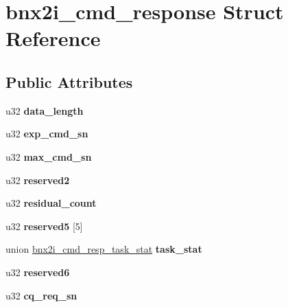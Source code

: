 \hypertarget{structbnx2i__cmd__response}{
\section{bnx2i\_\-cmd\_\-response Struct Reference}
\label{structbnx2i__cmd__response}
}
\subsection*{Public Attributes}
\begin{DoxyCompactItemize}
\item 
\hypertarget{structbnx2i__cmd__response_a04a27cf2d46ed4e6c29d33fe7ab5e81f}{
u32 {\bfseries data\_\-length}}
\label{structbnx2i__cmd__response_a04a27cf2d46ed4e6c29d33fe7ab5e81f}

\item 
\hypertarget{structbnx2i__cmd__response_aae738c34e5d8c9e93c7c438489730bad}{
u32 {\bfseries exp\_\-cmd\_\-sn}}
\label{structbnx2i__cmd__response_aae738c34e5d8c9e93c7c438489730bad}

\item 
\hypertarget{structbnx2i__cmd__response_a3ab0225e319b49ed438cc2d0af93ce5d}{
u32 {\bfseries max\_\-cmd\_\-sn}}
\label{structbnx2i__cmd__response_a3ab0225e319b49ed438cc2d0af93ce5d}

\item 
\hypertarget{structbnx2i__cmd__response_a785c4765be0e9d01d0af6f15069ec98c}{
u32 {\bfseries reserved2}}
\label{structbnx2i__cmd__response_a785c4765be0e9d01d0af6f15069ec98c}

\item 
\hypertarget{structbnx2i__cmd__response_a8b95b6c8cf158ab0be5cbae2731f65fe}{
u32 {\bfseries residual\_\-count}}
\label{structbnx2i__cmd__response_a8b95b6c8cf158ab0be5cbae2731f65fe}

\item 
\hypertarget{structbnx2i__cmd__response_aaa356564581e1449499ee4d14cce8000}{
u32 {\bfseries reserved5} \mbox{[}5\mbox{]}}
\label{structbnx2i__cmd__response_aaa356564581e1449499ee4d14cce8000}

\item 
\hypertarget{structbnx2i__cmd__response_a6eb7620dad21cdd37784af467d47f158}{
union \hyperlink{unionbnx2i__cmd__resp__task__stat}{bnx2i\_\-cmd\_\-resp\_\-task\_\-stat} {\bfseries task\_\-stat}}
\label{structbnx2i__cmd__response_a6eb7620dad21cdd37784af467d47f158}

\item 
\hypertarget{structbnx2i__cmd__response_a6e5cade368e8a9891c6d9aae3e268c25}{
u32 {\bfseries reserved6}}
\label{structbnx2i__cmd__response_a6e5cade368e8a9891c6d9aae3e268c25}

\item 
\hypertarget{structbnx2i__cmd__response_a7bc63475f143ff9554179a7fe9a1f45e}{
u32 {\bfseries cq\_\-req\_\-sn}}
\label{structbnx2i__cmd__response_a7bc63475f143ff9554179a7fe9a1f45e}

\end{DoxyCompactItemize}


